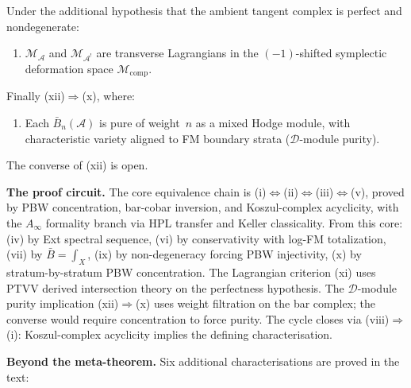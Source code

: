 \documentclass[11pt]{report}
\theoremstyle{definition}
\theoremstyle{remark}
\providecommand{\cA}{\mathcal{A}}
\providecommand{\barB}{\bar{B}}
\numberwithin{equation}{section}
\begin{document}
\noindent
Under the additional hypothesis that the ambient tangent complex is
perfect and nondegenerate:

\begin{enumerate}[label=\textup{(\roman*)},nosep,start=11]
\item $\mathcal M_\cA$ and $\mathcal M_{\cA^!}$ are transverse Lagrangians in the $(-1)$-shifted symplectic deformation space $\mathcal M_{\mathrm{comp}}$.
\end{enumerate}

\noindent
Finally (xii)$\Rightarrow$(x), where:

\begin{enumerate}[label=\textup{(\roman*)},nosep,start=12]
\item Each $\barB_n(\cA)$ is pure of weight~$n$ as a mixed Hodge module, with characteristic variety aligned to FM boundary strata ($\mathcal D$-module purity).
\end{enumerate}

\noindent The converse of (xii) is open.

\medskip
\noindent\textbf{The proof circuit.}\enspace
The core equivalence chain is
(i)$\Leftrightarrow$(ii)$\Leftrightarrow$(iii)$\Leftrightarrow$(v),
proved by PBW concentration, bar-cobar inversion, and
Koszul-complex acyclicity, with the $A_\infty$
formality branch via HPL transfer and Keller classicality. From this
core: (iv) by Ext spectral sequence, (vi) by conservativity with
log-FM totalization, (vii) by $\barB=\int_X$, (ix) by non-degeneracy
forcing PBW injectivity, (x) by stratum-by-stratum PBW concentration.
The Lagrangian criterion (xi) uses PTVV derived intersection theory
on the perfectness hypothesis. The $\mathcal D$-module purity
implication (xii)$\Rightarrow$(x) uses weight filtration on the bar
complex; the converse would require concentration to force purity.
The cycle closes via (viii)$\Rightarrow$(i): Koszul-complex acyclicity
implies the defining characterisation.

\medskip
\noindent\textbf{Beyond the meta-theorem.}\enspace
Six additional characterisations are proved in the text:
\end{document}
